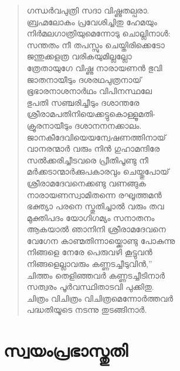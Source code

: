 \begin{verse}
ഗന്ധര്‍വപുത്രി സദാ വിഷ്ണുതല്പരാ.\\
ബ്രഹ്മലോകം പ്രവേശിച്ചിതു ഹേമയും\\
നിര്‍മലഗാത്രിയുമെന്നോടു ചൊല്ലിനാള്‍:\\
സന്തതം നീ തപസ്സും ചെയ്തിരിക്കെടോ\\
ജന്തുക്കളത്ര വരികയുമില്ലല്ലോ\\
ത്രേതായുഗേ വിഷ്ണു നാരായണന്‍ ഭുവി\\
ജാതനായീടും ദശരഥപുത്രനായ്\\
ഭൂഭാരനാശനാര്‍ഥം വിപിനസ്ഥലേ\\
ഭുപതി സഞ്ചരിച്ചീടും ദശാന്തരേ\\
ശ്രീരാമപതിനിയെക്കട്ടുകൊള്ളൂമതി-\\
ക്രൂരനായീടും ദശാനനനക്കാലം.\\
ജാനകീദേവിയെയന്വേഷണത്തിനായ്\\
വാനരന്മാര്‍ വരും നിന്‍ ഗുഹാമന്ദിരേ\\
സല്‍ക്കരിച്ചീടവരെ പ്രീതിപൂണ്ടു നീ\\
മര്‍ക്കടാന്മാര്‍ക്കുപകാരവും ചെയ്തുപോയ്\\
ശ്രീരാമദേവനെക്കണ്ടു വണങ്ങുക\\
നാരായണസ്വാമിതന്നെ രഘൂത്തമന്‍\\
ഭക്ത്യാ പരനെ സ്തുതിച്ചാല്‍ വരും തവ\\
മുക്തിപദം യോഗിഗമ്യം സനാതനം\\
ആകയാല്‍ ഞാനിനി ശ്രീരാമദേവനെ\\
വേഗേന കാണ്മതിന്നായ്ക്കൊണ്ടു പോകുന്നു\\
നിങ്ങളെ നേരേ പെരുവഴി കൂട്ടുവന്‍\\
നിങ്ങളെല്ലാവരും കണ്ണടച്ചീടുവിന്‍,”\\
ചിത്തം തെളിഞ്ഞവര്‍ കണ്ണടച്ചീടിനാര്‍\\
സത്വരം പൂര്‍വസ്ഥിതാടവി പുക്കിതു.\\
ചിത്രം വിചിത്രം വിചിത്രമെന്നോര്‍ത്തവര്‍\\
പദ്ധതിയൂടെ നടന്നു തുടങ്ങിനാര്‍.
\end{verse}


\section{സ്വയംപ്രഭാസ്തുതി}

